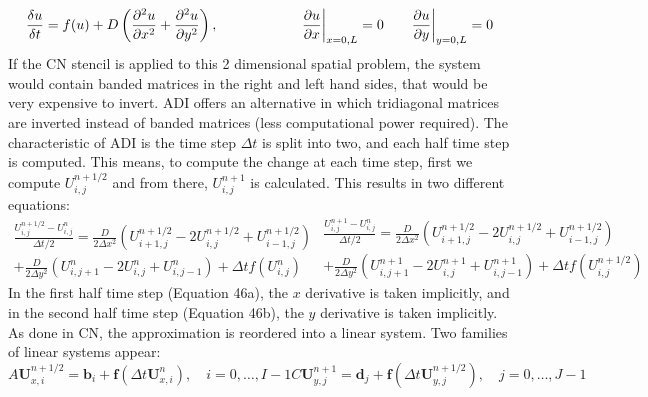 \begin{equation}
    \frac{\delta u}{\delta t} =  f(u) + D\left(\frac{\partial^{2} {u}}{\partial {x}^{2}} + \frac{\partial^{2} {u}}{\partial {y}^{2}}\right) ,   \quad \quad \quad \quad \quad \quad \pdv{u}{x}\biggr\rvert_{x=0,L}=0 \quad \quad \pdv{u}{y}\biggr\rvert_{y=0,L}=0
\end{equation}
If the CN stencil is applied to this 2 dimensional spatial problem, the system would contain banded matrices in the right and left hand sides, that would be very expensive to invert. \acrshort{ADI} offers an alternative in which tridiagonal matrices are inverted instead of banded matrices (less computational power required). The characteristic of \acrshort{ADI} is the time step $\Delta t$ is split into two, and each half time step is computed. This means, to compute the change at each time step, first we compute $U^{n+1/2}_{i,j} $ and from there,    $U^{n+1}_{i,j} $ is calculated. This results in two different equations:
\begin{subequations}
    \begin{equation}
        \begin{split}
            \frac{U^{n+1/2}_{i,j} - U^{n}_{i,j} }{\Delta t/2} = \frac{D}{2\Delta x^{2}}\left( U^{n+1/2}_{i+1,j} -  2U^{n+1/2}_{i,j} + U^{n+1/2}_{i-1,j}\right)  \\+ \frac{D}{2\Delta y^{2}}\left( U^{n}_{i,j+1} -  2U^{n}_{i,j} + U^{n}_{i,j-1}\right)  + \Delta t f(U^{n}_{i,j})
        \end{split}
    \end{equation}
    \begin{equation}
        \begin{split}
            \frac{U^{n+1}_{i,j} - U^{n}_{i,j} }{\Delta t/2} = \frac{D}{2\Delta x^{2}}\left( U^{n+1/2}_{i+1,j} -  2U^{n+1/2}_{i,j} + U^{n+1/2}_{i-1,j}\right)  \\+ \frac{D}{2\Delta y^{2}}\left( U^{n+1}_{i,j+1} -  2U^{n+1}_{i,j} + U^{n+1}_{i,j-1}\right)  + \Delta t f(U^{n+1/2}_{i,j})
        \end{split}
    \end{equation}
\end{subequations}
In the first half time step (Equation 46a), the $x$ derivative is taken implicitly, and in the second half time step (Equation 46b), the $y$ derivative is taken implicitly. As done in \acrshort{CN}, the approximation is reordered into a linear system. Two families of linear systems appear:
\begin{subequations}
    \begin{equation}
        A\textbf{U}^{n+1/2}_{x,i} = \textbf{b}_{i} + \textbf{f}(\Delta t \textbf{U}^{n}_{x,i}), \quad i=0,\ldots,I-1
    \end{equation}
    \begin{equation}
        C\textbf{U}^{n+1}_{y,j} = \textbf{d}_{j} + \textbf{f}(\Delta t \textbf{U}^{n+1/2}_{y,j}), \quad j=0,\ldots,J-1
    \end{equation}
\end{subequations}
